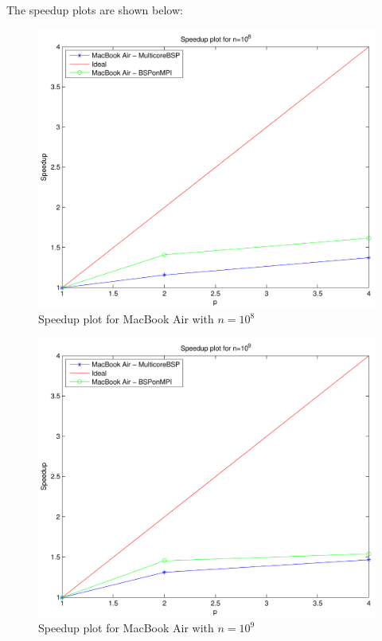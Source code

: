 \documentclass[a4paper,11pt]{article}
\begin{document}
The speedup plots are shown below:

\begin{figure}[H]
\begin{center}
\includegraphics[scale=0.6]{img/sp1e8m}
\end{center}
\caption{Speedup plot for MacBook Air with $n=10^8$} \label{mb:2}
\end{figure}

\begin{figure}[H]
\begin{center}
\includegraphics[scale=0.6]{img/sp1e9m}
\end{center}
\caption{Speedup plot for MacBook Air with $n=10^9$} \label{mb:2}
\end{figure}
\end{document}
